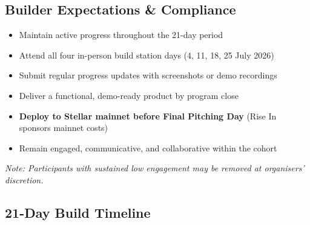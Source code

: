 \documentclass[11pt,a4paper]{article}
\newcommand{\stellar}{\textsf{Stellar}}
\begin{document}
\subsection{Builder Expectations \& Compliance}

\begin{warningbox}
  \begin{itemize}
    \item Maintain active progress throughout the 21-day period
    \item Attend all four in-person build station days (4, 11, 18, 25 July 2026)
    \item Submit regular progress updates with screenshots or demo recordings
    \item Deliver a functional, demo-ready product by program close
    \item \textbf{Deploy to \stellar{} mainnet before Final Pitching Day} (Rise In sponsors mainnet costs)
    \item Remain engaged, communicative, and collaborative within the cohort
  \end{itemize}
  \textit{Note: Participants with sustained low engagement may be removed at organisers' discretion.}
\end{warningbox}

\subsection{21-Day Build Timeline}
\end{document}
